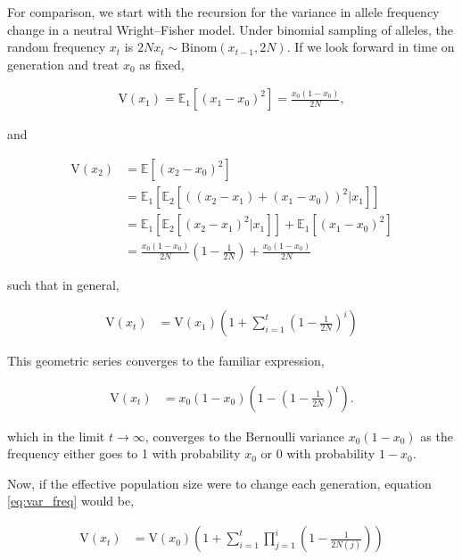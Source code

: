 \documentclass[11pt]{article}
\newcommand{\E}{\mathbb{E}}
\newcommand{\V}{\text{V}}
\begin{document}

For comparison, we start with the recursion for the variance in allele
frequency change in a neutral Wright--Fisher model. Under binomial sampling of
alleles, the random frequency $x_t$ is $2N x_t \sim \mathrm{Binom}(x_{t-1},
2N)$. If we look forward in time on generation and treat $x_0$ as fixed,

\begin{align}
  \V(x_1) = \E_1\left[(x_1 - x_0)^2\right]= \frac{x_0(1-x_0)}{2N},
\end{align}

and

\begin{align}
  \V(x_2) &= \E\left[(x_2 - x_0)^2\right] \\
          &= \E_1\left[\E_2\left[((x_2-x_1) + (x_1 - x_0))^2 | x_1\right]\right] \\
          &= \E_1\left[\E_2\left[(x_2-x_1)^2|x_1\right]\right] + \E_1\left[ (x_1 - x_0)^2\right] \\
          &= \frac{x_0(1-x_0)}{2N}\left(1 - \frac{1}{2N}\right) + \frac{x_0(1-x_0)}{2N}
\end{align}

such that in general, 

\begin{align}
  \label{eq:var_freq}
  \V(x_t) &= \V(x_1) \left(1 + \sum_{i=1}^t \left(1 - \frac{1}{2N}\right)^{i} \right)
\end{align}

This geometric series converges to the familiar expression,

\begin{align}
  \V(x_t) &= x_0(1-x_0)\left(1 - \left(1 - \frac{1}{2N}\right)^t \right).
\end{align}

which in the limit $t \to \infty$, converges to the Bernoulli variance
$x_0(1-x_0)$ as the frequency either goes to 1 with probability $x_0$ or 0 with
probability $1-x_0$.

Now, if the effective population size were to change each generation, equation
\eqref{eq:var_freq} would be,

\begin{align}
  \V(x_t) &= \V(x_0) \left(1 + \sum_{i=1}^t \prod_{j=1}^{i} \left(1 - \frac{1}{2N(j)}\right) \right)
\end{align}
\end{document}
